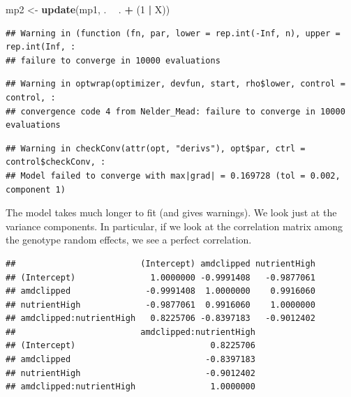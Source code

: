 \documentclass[
  12pt,
]{book}
\newenvironment{Shaded}{\begin{snugshade}}{\end{snugshade}}
\newcommand{\DecValTok}[1]{\textcolor[rgb]{0.00,0.00,0.81}{#1}}
\newcommand{\KeywordTok}[1]{\textcolor[rgb]{0.13,0.29,0.53}{\textbf{#1}}}
\newcommand{\NormalTok}[1]{#1}
\newcommand{\OperatorTok}[1]{\textcolor[rgb]{0.81,0.36,0.00}{\textbf{#1}}}
\newcommand{\StringTok}[1]{\textcolor[rgb]{0.31,0.60,0.02}{#1}}
\begin{document}
\begin{Shaded}
\begin{Highlighting}[]
\NormalTok{mp2 <-}\StringTok{ }\KeywordTok{update}\NormalTok{(mp1, . }\OperatorTok{~}\StringTok{ }\NormalTok{. }\OperatorTok{+}\StringTok{ }\NormalTok{(}\DecValTok{1} \OperatorTok{|}\StringTok{ }\NormalTok{X))}
\end{Highlighting}
\end{Shaded}

\begin{verbatim}
## Warning in (function (fn, par, lower = rep.int(-Inf, n), upper = rep.int(Inf, :
## failure to converge in 10000 evaluations
\end{verbatim}

\begin{verbatim}
## Warning in optwrap(optimizer, devfun, start, rho$lower, control = control, :
## convergence code 4 from Nelder_Mead: failure to converge in 10000 evaluations
\end{verbatim}

\begin{verbatim}
## Warning in checkConv(attr(opt, "derivs"), opt$par, ctrl = control$checkConv, :
## Model failed to converge with max|grad| = 0.169728 (tol = 0.002, component 1)
\end{verbatim}

The model takes much longer to fit (and gives warnings).
We look just at the variance components. In particular, if we look at the correlation matrix among the genotype random effects, we see a perfect
correlation.

\begin{Shaded}
\end{Shaded}

\begin{verbatim}
##                         (Intercept) amdclipped nutrientHigh
## (Intercept)               1.0000000 -0.9991408   -0.9877061
## amdclipped               -0.9991408  1.0000000    0.9916060
## nutrientHigh             -0.9877061  0.9916060    1.0000000
## amdclipped:nutrientHigh   0.8225706 -0.8397183   -0.9012402
##                         amdclipped:nutrientHigh
## (Intercept)                           0.8225706
## amdclipped                           -0.8397183
## nutrientHigh                         -0.9012402
## amdclipped:nutrientHigh               1.0000000
\end{verbatim}
\end{document}
